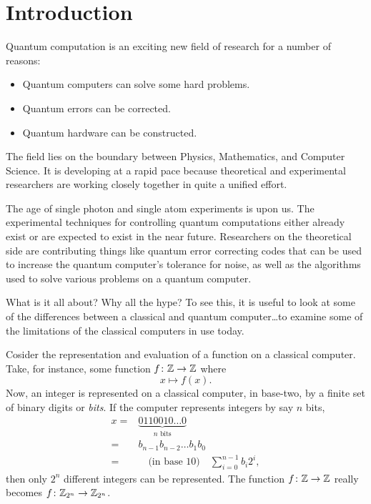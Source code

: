 


\chapter{Introduction}
\label{chap:introduction}
%

Quantum computation is an exciting new field of research for a number 
of reasons\cite{Preskill:98}:  
\begin{itemize}
\item Quantum computers can solve some hard problems.
\item Quantum errors can be corrected.
\item Quantum hardware can be constructed.
\end{itemize}
The field lies on the boundary between Physics, Mathematics, 
and Computer Science.  It is developing at a rapid pace because
theoretical and experimental researchers are working closely together
in quite a unified effort.

The age of single photon and single atom experiments is upon us. 
The experimental techniques for controlling quantum computations 
either already exist or are expected to exist in the near future.
Researchers on the theoretical side are contributing
things like quantum error correcting codes that can be used to 
increase the quantum computer's tolerance for noise, as well as the
algorithms used to solve various problems on a quantum computer.

What is it all about?  Why all the hype?
To see this, it is useful to look at some of the differences 
between a classical and quantum computer\dots to examine
some of the limitations of the classical computers in use
today.

Cosider the representation and evaluation of a function on a classical
computer.  Take, for instance, some function $f\colon{\mathbb{Z}}\to{\mathbb{Z}}$ where
\begin{equation}
x\mapsto f(x).
\label{e:funcs}
\end{equation}
Now, an integer is represented on a classical computer, in base-two, by a 
finite set of binary digits or \emph{bits}.
If the computer represents
integers by say $n$ bits,
\begin{equation}
\begin{split}
x =& \underset{n\text{ bits}}{\underbrace{0110010\ldots 0}}\\
=& b_{n-1}b_{n-2}\ldots b_1b_0\\
=&\quad\text{(in base 10)}\quad\sum_{i=0}^{n-1} b_i2^i,
\end{split}
\end{equation}
then only $2^n$ different integers can be represented.
The function $f\colon{\mathbb{Z}}\to{\mathbb{Z}}$ really becomes $f\colon{\mathbb{Z}}_{2^n}\to{\mathbb{Z}}_{2^n}$.

